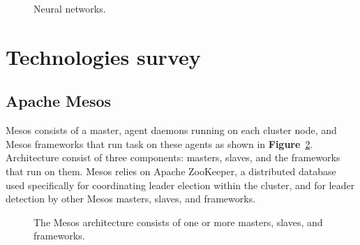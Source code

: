 \documentclass[12pt,oneside,openright,a4paper]{cpe-english-project}
\begin{document}
\begin{figure}[!h]\centering
\setlength{\fboxrule}{0mm} %
\setlength{\fboxsep}{0cm}
\caption{Neural networks.}\label{fig:NN}
\end{figure}

\newpage
\section{Technologies survey}  
\subsection{Apache Mesos}
Mesos consists of a master, agent daemons running on each cluster node, and Mesos frameworks that run task on these agents as shown in \textbf{Figure}~\ref{fig:MesosArc}. Architecture consist of three components: masters, slaves, and the frameworks that run on them. Mesos relies on Apache ZooKeeper, a distributed database used specifically for coordinating leader election within the cluster, and for leader detection by other Mesos masters, slaves, and frameworks. \cite{mesosInAction}

\begin{figure}[!h]\centering
\setlength{\fboxrule}{0mm} %
\setlength{\fboxsep}{0cm}
\caption{The Mesos architecture consists of one or more masters, slaves, and frameworks. \cite{mesosInAction}}\label{fig:MesosArc}
\end{figure}
\end{document}
